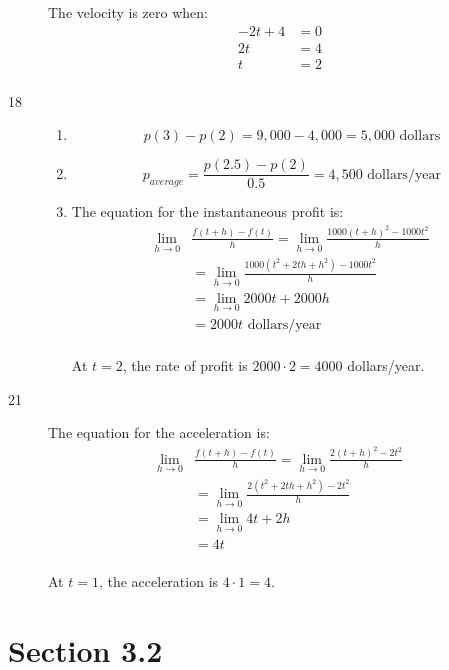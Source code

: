 \documentclass{exam}
\begin{document}
\begin{description}
The velocity is zero when:
\begin{align*}
  -2t + 4 &= 0 \\
  2t &= 4 \\
  t &= 2 \\
\end{align*}

\pagebreak

\item[18]
\begin{enumerate}[a]

\item 
\[
  p(3) - p(2) = 9,000 - 4,000 = 5,000 \text{ dollars}
\]

\item
\[
  p_{average} = \frac{p(2.5) - p(2)}{0.5} = 4,500 \text{ dollars/year}
\]

\item
The equation for the instantaneous profit is:
\begin{align*}
  \lim_{h \to 0} &\frac{f(t+h) - f(t)}{h} = \lim_{h \to 0} \frac{1000(t + h)^2 - 1000t^2}{h} \\
  &= \lim_{h \to 0} \frac{1000(t^2 + 2th + h^2) - 1000t^2}{h} \\
  &= \lim_{h \to 0} 2000t + 2000h \\
  &= 2000t \text{ dollars/year} \\
\end{align*}

At $t = 2$, the rate of profit is $2000 \cdot 2 = 4000$ dollars/year.

\end{enumerate}

\item[21]
The equation for the acceleration is:
\begin{align*}
  \lim_{h \to 0} &\frac{f(t+h) - f(t)}{h} = \lim_{h \to 0} \frac{2(t + h)^2 - 2t^2}{h} \\
  &= \lim_{h \to 0} \frac{2(t^2 + 2th + h^2) - 2t^2}{h} \\
  &= \lim_{h \to 0} 4t + 2h \\
  &= 4t \\
\end{align*}

At $t = 1$, the acceleration is $4 \cdot 1 = 4$.

\end{description}

\section{Section 3.2}
\end{document}
